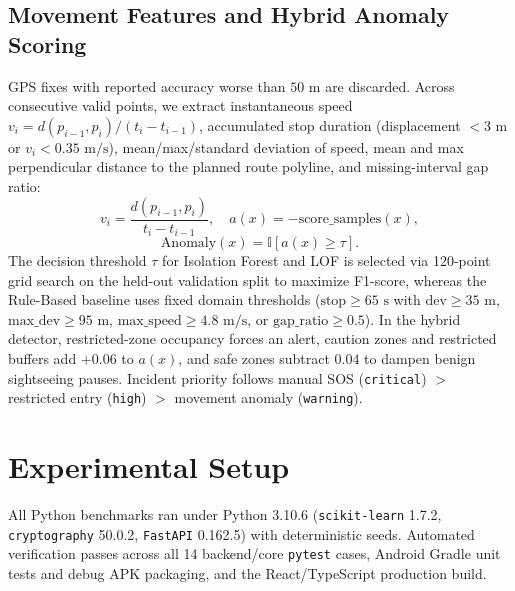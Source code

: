 \documentclass[conference]{IEEEtran}
\begin{document}
\subsection{Movement Features and Hybrid Anomaly Scoring}
GPS fixes with reported accuracy worse than $50\text{~m}$ are discarded. Across consecutive valid points, we extract instantaneous speed $v_i = d(p_{i-1}, p_i)/(t_i - t_{i-1})$, accumulated stop duration (displacement $< 3\text{~m}$ or $v_i < 0.35\text{~m/s}$), mean/max/standard deviation of speed, mean and max perpendicular distance to the planned route polyline, and missing-interval gap ratio:
\begin{equation}
v_i = \frac{d(p_{i-1}, p_i)}{t_i - t_{i-1}}, \quad a(x) = -\text{score\_samples}(x),
\label{eq:score}
\end{equation}
\begin{equation}
\text{Anomaly}(x) = \mathbb{I}[a(x) \ge \tau].
\label{eq:thresh}
\end{equation}
The decision threshold $\tau$ for Isolation Forest and LOF is selected via 120-point grid search on the held-out validation split to maximize F1-score, whereas the Rule-Based baseline uses fixed domain thresholds ($\text{stop} \ge 65\text{~s}$ with $\text{dev} \ge 35\text{~m}$, $\text{max\_dev} \ge 95\text{~m}$, $\text{max\_speed} \ge 4.8\text{~m/s}$, or $\text{gap\_ratio} \ge 0.5$). In the hybrid detector, restricted-zone occupancy forces an alert, caution zones and restricted buffers add $+0.06$ to $a(x)$, and safe zones subtract $0.04$ to dampen benign sightseeing pauses. Incident priority follows manual SOS (\texttt{critical}) $>$ restricted entry (\texttt{high}) $>$ movement anomaly (\texttt{warning}).

\section{Experimental Setup}
All Python benchmarks ran under Python 3.10.6 (\texttt{scikit-learn} 1.7.2, \texttt{cryptography} 50.0.2, \texttt{FastAPI} 0.162.5) with deterministic seeds. Automated verification passes across all 14 backend/core \texttt{pytest} cases, Android Gradle unit tests and debug APK packaging, and the React/TypeScript production build.
\end{document}
